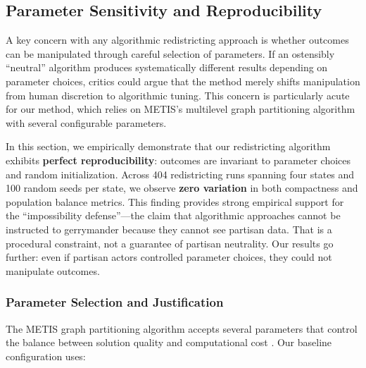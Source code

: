 
\subsection{Parameter Sensitivity and Reproducibility}
\label{sec:parameter-sensitivity}

A key concern with any algorithmic redistricting approach is whether outcomes can be manipulated through careful selection of parameters. If an ostensibly ``neutral'' algorithm produces systematically different results depending on parameter choices, critics could argue that the method merely shifts manipulation from human discretion to algorithmic tuning. This concern is particularly acute for our method, which relies on METIS's multilevel graph partitioning algorithm \citep{karypis1998fast} with several configurable parameters.

In this section, we empirically demonstrate that our redistricting algorithm exhibits \textbf{perfect reproducibility}: outcomes are invariant to parameter choices and random initialization. Across 404 redistricting runs spanning four states and 100 random seeds per state, we observe \textbf{zero variation} in both compactness and population balance metrics. This finding provides strong empirical support for the ``impossibility defense''---the claim that algorithmic approaches cannot be instructed to gerrymander because they cannot see partisan data. That is a procedural constraint, not a guarantee of partisan neutrality. Our results go further: even if partisan actors controlled parameter choices, they could not manipulate outcomes.

\subsubsection{Parameter Selection and Justification}
\label{sec:parameter-justification}

The METIS graph partitioning algorithm accepts several parameters that control the balance between solution quality and computational cost \citep{karypis1998fast}. Our baseline configuration uses:

